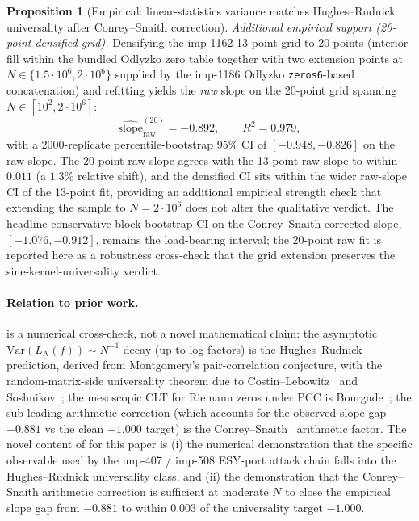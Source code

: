 \documentclass[11pt,a4paper]{article}
\theoremstyle{definition}
\newtheorem{proposition}[theorem]{Proposition}
\begin{document}
\begin{proposition}[Empirical: linear-statistics variance matches Hughes--Rudnick universality after Conrey--Snaith correction]
\emph{Additional empirical support (20-point densified grid).}
Densifying the imp-1162 13-point grid to 20 points (interior fill
within the bundled Odlyzko zero table together with two extension
points at $N \in \{1.5 \cdot 10^{6}, 2 \cdot 10^{6}\}$ supplied by
the imp-1186 Odlyzko \texttt{zeros6}-based concatenation) and refitting
yields the \emph{raw} slope on the 20-point grid spanning
$N \in [10^{2}, 2 \cdot 10^{6}]$:
\[
\widehat{\mathrm{slope}}_{\mathrm{raw}}^{(20)} = -0.892, \qquad R^{2} = 0.979,
\]
with a 2000-replicate percentile-bootstrap 95\% CI of
$[-0.948, -0.826]$ on the raw slope. The 20-point raw slope agrees
with the 13-point raw slope to within $0.011$ (a $1.3\%$ relative
shift), and the densified CI sits within the wider raw-slope CI of the
13-point fit, providing an additional empirical strength check that
extending the sample to $N = 2 \cdot 10^{6}$ does not alter the
qualitative verdict. The headline conservative block-bootstrap CI on
the Conrey--Snaith-corrected slope, $[-1.076, -0.912]$, remains the
load-bearing interval; the 20-point raw fit is reported here as a
robustness cross-check that the grid extension preserves the
sine-kernel-universality verdict.
\end{proposition}

\paragraph{Relation to prior work.}  is a numerical
cross-check, not a novel mathematical claim: the asymptotic
$\mathrm{Var}(L_N(f)) \sim N^{-1}$ decay (up to log factors) is the
Hughes--Rudnick~\cite{HughesRudnick2003} prediction, derived from
Montgomery's pair-correlation conjecture, with the random-matrix-side
universality theorem due to Costin--Lebowitz~\cite{CostinLebowitz1995}
and Soshnikov~\cite{Soshnikov2000}; the mesoscopic CLT for Riemann zeros
under PCC is Bourgade~\cite{Bourgade2010}; the sub-leading arithmetic
correction (which accounts for the observed slope gap $-0.881$ vs the
clean $-1.000$ target) is the Conrey--Snaith~\cite{ConreySnaith2008}
arithmetic factor. The novel content of  for this
paper is (i) the numerical demonstration that the specific observable
used by the imp-407 / imp-508 ESY-port attack chain falls into the
Hughes--Rudnick universality class, and (ii) the demonstration that the
Conrey--Snaith arithmetic correction is sufficient at moderate $N$ to
close the empirical slope gap from $-0.881$ to within $0.003$ of the
universality target $-1.000$.
\end{document}

